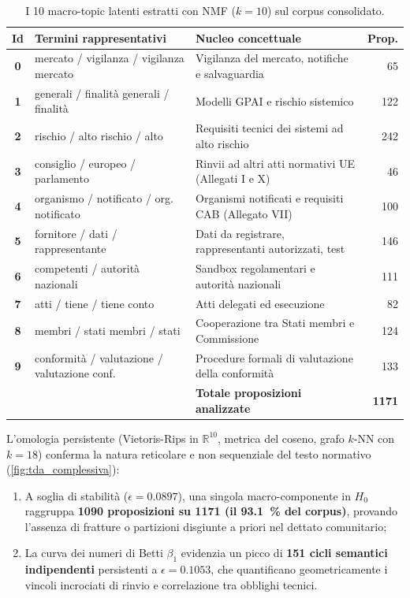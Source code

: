 \documentclass[12pt,a4paper,oneside]{report}
\begin{document}
\begin{table}[htbp]
  \centering
  \small
  \caption[I 10 macro-topic latenti estratti con NMF]{I 10 macro-topic latenti estratti con NMF ($k=10$) sul corpus consolidato.}
  \label{tab:nmf_topics}
  \begin{tabularx}{\textwidth}{c l X r}
    \toprule
    \textbf{Id} & \textbf{Termini rappresentativi} & \textbf{Nucleo concettuale} & \textbf{Prop.} \\
    \midrule
    \textbf{0} & mercato / vigilanza / vigilanza mercato & Vigilanza del mercato, notifiche e salvaguardia & 65 \\
    \textbf{1} & generali / finalità generali / finalità & Modelli GPAI e rischio sistemico & 122 \\
    \textbf{2} & rischio / alto rischio / alto & Requisiti tecnici dei sistemi ad alto rischio & 242 \\
    \textbf{3} & consiglio / europeo / parlamento & Rinvii ad altri atti normativi UE (Allegati I e X) & 46 \\
    \textbf{4} & organismo / notificato / org. notificato & Organismi notificati e requisiti CAB (Allegato VII) & 100 \\
    \textbf{5} & fornitore / dati / rappresentante & Dati da registrare, rappresentanti autorizzati, test & 146 \\
    \textbf{6} & competenti / autorità nazionali & Sandbox regolamentari e autorità nazionali & 111 \\
    \textbf{7} & atti / tiene / tiene conto & Atti delegati ed esecuzione & 82 \\
    \textbf{8} & membri / stati membri / stati & Cooperazione tra Stati membri e Commissione & 124 \\
    \textbf{9} & conformità / valutazione / valutazione conf. & Procedure formali di valutazione della conformità & 133 \\
    \midrule
    & & \textbf{Totale proposizioni analizzate} & \textbf{\num{1171}} \\
    \bottomrule
  \end{tabularx}
\end{table}

L'omologia persistente (Vietoris-Rips in $\mathbb{R}^{10}$, metrica del coseno, grafo $k$-NN con $k=18$) conferma la natura reticolare e non sequenziale del testo normativo (\cref{fig:tda_complessiva}):
\begin{enumerate}
  \item A soglia di stabilità ($\epsilon = \num{0,0897}$), una singola macro-componente in $H_0$ raggruppa \textbf{\num{1090} proposizioni su \num{1171} (il \SI{93,1}{\percent} del corpus)}, provando l'assenza di fratture o partizioni disgiunte a priori nel dettato comunitario;
  \item La curva dei numeri di Betti $\beta_1$ evidenzia un picco di \textbf{151 cicli semantici indipendenti} persistenti a $\epsilon = \num{0,1053}$, che quantificano geometricamente i vincoli incrociati di rinvio e correlazione tra obblighi tecnici.
\end{enumerate}
\end{document}
